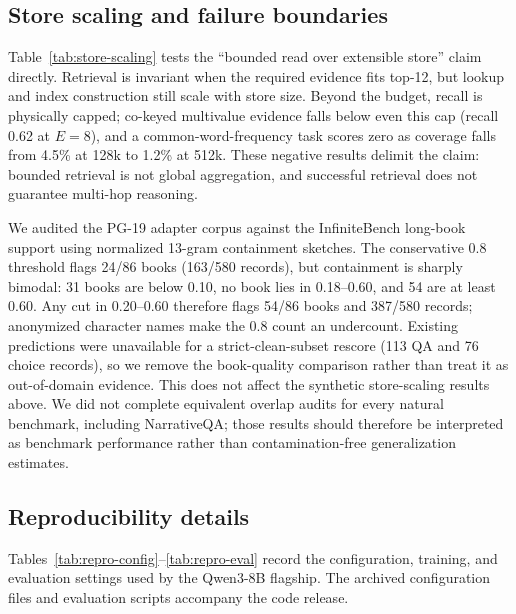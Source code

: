 \FloatBarrier
\subsection{Store scaling and failure boundaries}
\label{app:scaling}
Table~\ref{tab:store-scaling} tests the ``bounded read over extensible store''
claim directly. Retrieval is invariant when the required evidence fits top-12,
but lookup and index construction still scale with store size. Beyond the budget,
recall is physically capped; co-keyed multivalue evidence falls below even this
cap (recall 0.62 at $E{=}8$), and a common-word-frequency task scores zero as
coverage falls from 4.5\% at 128k to 1.2\% at 512k. These negative results delimit
the claim: bounded retrieval is not global aggregation, and successful retrieval
does not guarantee multi-hop reasoning.



We audited the PG-19 adapter corpus against the InfiniteBench long-book support
using normalized 13-gram containment sketches. The conservative 0.8 threshold
flags 24/86 books (163/580 records), but containment is sharply bimodal: 31 books
are below 0.10, no book lies in 0.18--0.60, and 54 are at least 0.60. Any cut in
0.20--0.60 therefore flags 54/86 books and 387/580 records; anonymized character
names make the 0.8 count an undercount. Existing predictions were unavailable
for a strict-clean-subset rescore (113 QA and 76 choice records), so we remove
the book-quality comparison rather than treat it as out-of-domain evidence.
This does not affect the synthetic store-scaling results above.
We did not complete equivalent overlap audits for every natural benchmark,
including NarrativeQA; those results should therefore be interpreted as
benchmark performance rather than contamination-free generalization estimates.

\subsection{Reproducibility details}
\label{app:reproducibility}
Tables~\ref{tab:repro-config}--\ref{tab:repro-eval} record the configuration,
training, and evaluation settings used by the Qwen3-8B flagship. The archived
configuration files and evaluation scripts accompany the code release.

